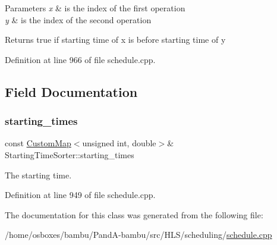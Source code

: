 \begin{DoxyParams}{Parameters}
{\em x} & is the index of the first operation \\
\hline
{\em y} & is the index of the second operation \\
\hline
\end{DoxyParams}
\begin{DoxyReturn}{Returns}
true if starting time of x is before starting time of y 
\end{DoxyReturn}


Definition at line 966 of file schedule.\+cpp.



\subsection{Field Documentation}
\mbox{\label{classStartingTimeSorter_a0eea213355a6758cbc2f153c5b9f593c}} 
\subsubsection{\texorpdfstring{starting\+\_\+times}{starting\_times}}
{\footnotesize\ttfamily const \hyperlink{custom__map_8hpp_a18ca01763abbe3e5623223bfe5aaac6b}{Custom\+Map}$<$unsigned int, double$>$\& Starting\+Time\+Sorter\+::starting\+\_\+times\hspace{0.3cm}{\ttfamily [protected]}}



The starting time. 



Definition at line 949 of file schedule.\+cpp.



The documentation for this class was generated from the following file\+:\begin{DoxyCompactItemize}
\item 
/home/osboxes/bambu/\+Pand\+A-\/bambu/src/\+H\+L\+S/scheduling/\hyperlink{schedule_8cpp}{schedule.\+cpp}\end{DoxyCompactItemize}
